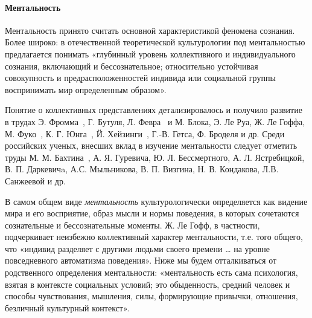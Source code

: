 \paragraph{Ментальность}
\label{mentality}
Ментальность принято считать основной характеристикой феномена сознания\autocite[][52]{edoshina2000}. Более широко: в отечественной теоретической культурологии под ментальностью предлагается понимать «глубинный уровень коллективного и индивидуального сознания, включающий и бессознательное; относительно устойчивая совокупность и предрасположенностей индивида или социальной группы воспринимать мир определенным образом»\autocite[][414]{razlogov2005}.

Понятие о коллективных представлениях детализировалось и получило развитие в трудах Э. Фромма~\autocite{book:davydov}, Г. Бутуля,
Л. Февра~\autocite{book:febvre} и М. Блока, Э. Ле Руа, Ж. Ле Гоффа,
М. Фуко~\autocite{book:arch}, К. Г. Юнга~\autocite{book:yung},
Й. Хейзинги~\autocite{book:heizenga}, Г.-В. Гетса, Ф. Броделя  и др. Среди российских ученых, внесших вклад в изучение ментальности следует отметить труды М. М. Бахтина~\autocite{book:tamarchenko}, А. Я. Гуревича, Ю. Л. Бессмертного, А. Л. Ястребицкой, В. П. Даркевичa\autocite{levit1998}, А.С. Мыльникова\autocite{milnikov1996}, В. П. Визгина, Н. В. Кондакова, Л.В. Санжеевой\autocite{sanjeeva2011} и др.

В самом общем виде \emph{ментальность} культурологически определяется как
видение мира и его восприятие, образ мысли и нормы поведения, в которых сочетаются
сознательные и бессознательные моменты. Ж. Ле Гофф, в частности, подчеркивает неизбежно коллективный характер ментальности, т.е. того общего, что «индивид разделяет с другими людьми своего времени … на уровне повседневного автоматизма поведения»\autocite{sharte2004}. Ниже мы будем отталкиваться от родственного определения ментальности: «ментальность есть сама психология, взятая в контексте социальных условий; это обыденность, средний человек и способы чувствования, мышления, силы, формирующие привычки, отношения, безличный культурный контекст»\autocite{online:kulturolog}.

